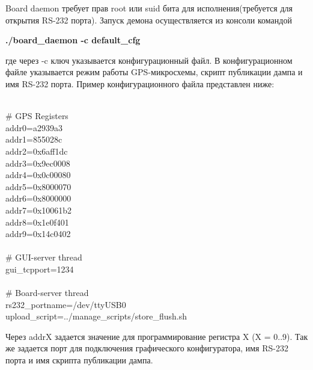 Board daemon требует прав root или suid бита для исполнения(требуется для открытия RS-232 порта). Запуск демона осуществляется из консоли командой
\begin{center}
\textbf{./board\_daemon -c default\_cfg}
\end{center}
где через -c ключ указывается конфигурационный файл. В конфигурационном файле указывается режим работы GPS-микросхемы, скрипт публикации дампа и имя RS-232 порта.
Пример конфигурационного файла представлен ниже:

\hrulefill \\
    \# GPS Registers \\
    addr0=a2939a3 \\
    addr1=855028c \\
    addr2=0x6aff1dc \\
    addr3=0x9ec0008 \\
    addr4=0x0c00080 \\
    addr5=0x8000070 \\
    addr6=0x8000000 \\ 
    addr7=0x10061b2 \\
    addr8=0x1e0f401 \\
    addr9=0x14c0402 \\
\\
    \# GUI-server thread \\
    gui\_tcpport=1234 \\
\\
    \# Board-server thread \\
    rs232\_portname=/dev/ttyUSB0 \\
    upload\_script=../manage\_scripts/store\_flush.sh

\hrulefill

Через addrX задается значение для программирование регистра X (X = 0..9). Так же задается порт для подключения графического конфигуратора,
имя RS-232 порта и имя скрипта публикации дампа.

\newpage
